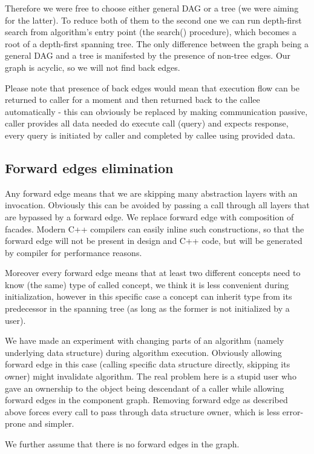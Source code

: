Therefore we were free to choose either general DAG or a tree (we were aiming
for the latter). To reduce both of them to the second one we can run
depth-first search from algorithm's entry point (the search() procedure), which
becomes a root of a depth-first spanning tree. The only difference between the
graph being a general DAG and a tree is manifested by the presence of non-tree
edges. Our graph is acyclic, so we will not find back edges.

Please note that presence of back edges would mean that execution flow can be
returned to caller for a moment and then returned back to the callee
automatically - this can obviously be replaced by making communication
passive, caller provides all data needed do execute call (query) and expects
response, every query is initiated by caller and completed by callee using
provided data.

\subsection{Forward edges elimination}
Any forward edge means that we are skipping many abstraction layers with an
invocation. Obviously this can be avoided by passing a call through all layers
that are bypassed by a forward edge. We replace forward edge with composition
of facades. Modern C++ compilers can easily inline such constructions, so that
the forward edge will not be present in design and C++ code, but will be
generated by compiler for performance reasons.

Moreover every forward edge means that at least two different concepts need to
know (the same) type of called concept, we think it is less convenient during
initialization, however in this specific case a concept can inherit type from
its predecessor in the spanning tree (as long as the former is not initialized
by a user).

We have made an experiment with changing parts of an algorithm (namely
underlying data structure) during algorithm execution. Obviously allowing
forward edge in this case (calling specific data structure directly, skipping
its owner) might invalidate algorithm. The real problem here is a stupid user
who gave an ownership to the object being descendant of a caller while allowing
forward edges in the component graph. Removing forward edge as described above
forces every call to pass through data structure owner, which is less
error-prone and simpler.

We further assume that there is no forward edges in the graph.

